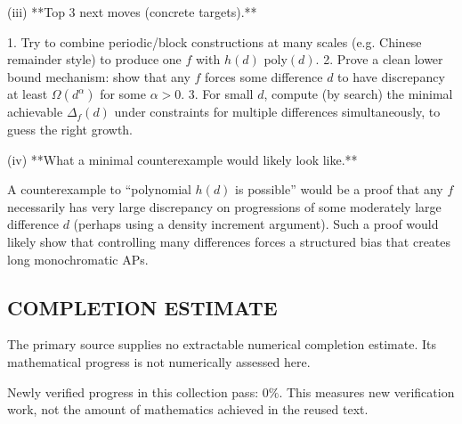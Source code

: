 (iii) **Top 3 next moves (concrete targets).**

1. Try to combine periodic/block constructions at many scales (e.g. Chinese remainder style) to produce one $f$ with $h(d)$ poly$(d)$.
2. Prove a clean lower bound mechanism: show that any $f$ forces some difference $d$ to have discrepancy at least $\Omega(d^\alpha)$ for some $\alpha>0$.
3. For small $d$, compute (by search) the minimal achievable $\Delta_f(d)$ under constraints for multiple differences simultaneously, to guess the right growth.

(iv) **What a minimal counterexample would likely look like.**

A counterexample to “polynomial $h(d)$ is possible” would be a proof that any $f$ necessarily has very large discrepancy on progressions of some moderately large difference $d$ (perhaps using a density increment argument). Such a proof would likely show that controlling many differences forces a structured bias that creates long monochromatic APs.



\subsection*{COMPLETION ESTIMATE}
The primary source supplies no extractable numerical completion estimate. Its mathematical progress is not numerically assessed here.

Newly verified progress in this collection pass: $0\%$. This measures new verification work, not the amount of mathematics achieved in the reused text.
